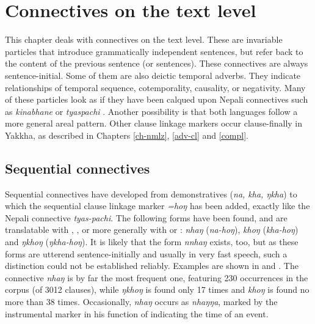 ﻿\chapter{Connectives on the text level}\label{clink-rest}


This chapter deals with connectives on the text level. These are invariable particles that introduce grammatically independent sentences, but refer back to the content of the previous sentence (or sentences).  These connectives are always sentence-initial. Some of them are also deictic temporal adverbs. They indicate relationships of temporal sequence, cotemporality, causality, or negativity. Many of these particles look as if they have been calqued upon Nepali connectives such as  \emph{kinabhane}  or \emph{tyaspachi} . Another possibility is that both languages follow a more general areal pattern. Other  clause linkage markers occur clause-finally in Yakkha, as described in Chapters  \ref{ch-nmlz}, \ref{adv-cl} and \ref{compl}.

\section{Sequential connectives}

Sequential connectives have developed from demonstratives (\emph{na, kha, ŋkha}) to which  the sequential clause linkage marker \emph{=hoŋ} 
has been added, exactly like the Nepali connective \emph{tyas-pachi}. The following forms have been found, and are translatable with , , or more generally with  or : \emph{nhaŋ} (\emph{na-hoŋ}), \emph{khoŋ} (\emph{kha-hoŋ}) and \emph{ŋkhoŋ} (\emph{ŋkha-hoŋ}). It is likely that the form \emph{nnhaŋ} exists, too, but as these forms are utterend sentence-initially and usually in very fast speech, such a distinction could not be established reliably. Examples are shown in  \Next and \NNext. The connective \emph{nhaŋ} is by far the most frequent one, featuring 230 occurrences in the corpus (of 3012 clauses), while \emph{ŋkhoŋ} is found only 17 times and \emph{khoŋ} is found no more than 38 times. Occasionally, \emph{nhaŋ} occurs as \emph{nhaŋŋa}, marked by the instrumental marker in his function of indicating the time of an event.

